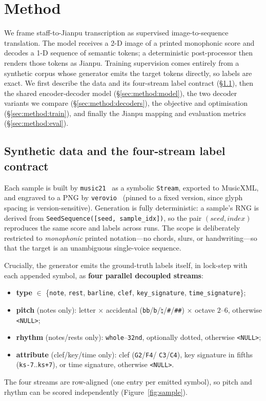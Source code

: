 \section{Method}
\label{section:method}

We frame staff-to-Jianpu transcription as supervised image-to-sequence
translation. The model receives a 2-D image of a printed monophonic score and
decodes a 1-D sequence of semantic tokens; a deterministic post-processor then
renders those tokens as Jianpu. Training supervision comes entirely from a
synthetic corpus whose generator emits the target tokens directly, so labels are
exact. We first describe the data and its four-stream label contract
(\S\ref{sec:method:data}), then the shared encoder-decoder model
(\S\ref{sec:method:model}), the two decoder variants we compare
(\S\ref{sec:method:decoders}), the objective and optimisation
(\S\ref{sec:method:train}), and finally the Jianpu mapping and evaluation metrics
(\S\ref{sec:method:eval}).

\subsection{Synthetic data and the four-stream label contract}
\label{sec:method:data}

Each sample is built by \texttt{music21}~\citep{cuthbert2010music21} as a symbolic
\texttt{Stream}, exported to MusicXML, and engraved to a PNG by
\texttt{verovio}~\citep{pugin2014verovio} (pinned to a fixed version, since glyph
spacing is version-sensitive). Generation is fully deterministic: a sample's RNG
is derived from \texttt{SeedSequence([seed, sample\_idx])}, so the pair
$(\textit{seed}, \textit{index})$ reproduces the same score and labels across
runs. The scope is deliberately restricted to \emph{monophonic} printed
notation---no chords, slurs, or handwriting---so that the target is an
unambiguous single-voice sequence.

Crucially, the generator emits the ground-truth labels itself, in lock-step with
each appended symbol, as \textbf{four parallel decoupled streams}:
\begin{itemize}
    \item \textbf{type} $\in$ \{\texttt{note}, \texttt{rest}, \texttt{barline},
    \texttt{clef}, \texttt{key\_signature}, \texttt{time\_signature}\};
    \item \textbf{pitch} (notes only): letter $\times$ accidental
    (\texttt{bb}/\texttt{b}/\texttt{$\natural$}/\texttt{\#}/\texttt{\#\#})
    $\times$ octave $2$--$6$, otherwise \texttt{<NULL>};
    \item \textbf{rhythm} (notes/rests only): \texttt{whole}--\texttt{32nd},
    optionally dotted, otherwise \texttt{<NULL>};
    \item \textbf{attribute} (clef/key/time only): clef (\texttt{G2}/\texttt{F4}/%
    \texttt{C3}/\texttt{C4}), key signature in fifths
    (\texttt{ks-7}..\texttt{ks+7}), or time signature, otherwise \texttt{<NULL>}.
\end{itemize}
The four streams are row-aligned (one entry per emitted symbol), so pitch and
rhythm can be scored independently (Figure~\ref{fig:sample}).

